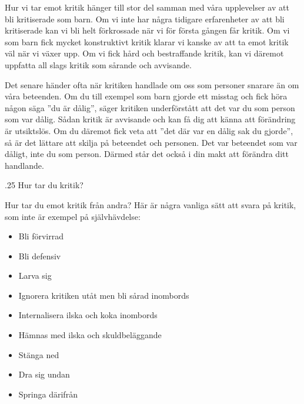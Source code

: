 \documentclass[swedish,a4paper]{book}
\makeatletter
\renewcommand\subsection{\@startsection{subsection}{1}{\z@}%
                                   {\baselineskip}%
                                   {.25\baselineskip}%
                                   {\fontsize{1\baselineskip}{1.25\baselineskip}\selectfont\sffamily\bfseries}} %
\makeatother
\begin{document}
Hur vi tar emot kritik hänger till stor del samman med våra upplevelser av att bli kritiserade som barn. Om vi inte har några tidigare erfarenheter av att bli kritiserade kan vi bli helt förkrossade när vi för första gången får kritik. Om vi som barn fick mycket konstruktivt kritik klarar vi kanske av att ta emot kritik väl när vi växer upp. Om vi fick hård och bestraffande kritik, kan vi däremot uppfatta all slags kritik som sårande och avvisande.

Det senare händer ofta när kritiken handlade om oss som personer snarare än om våra beteenden.
Om du till exempel som barn gjorde ett misstag och fick höra någon säga ''du är dålig'', säger kritiken underförstått att det var du som person som var dålig. Sådan kritik är avvisande och kan få dig att känna att förändring är utsiktslös. Om du däremot fick veta att ''det där var en dålig sak du gjorde'', så är det lättare att skilja på beteendet och personen. Det var beteendet som var dåligt, inte du som person. Därmed står det också i din makt att förändra ditt handlande.

\subsection{Hur tar du kritik?}

Hur tar du emot kritik från andra? Här är några vanliga sätt att svara på kritik, som inte är exempel på självhävdelse:

\begin{itemize}

\item Bli förvirrad

\item Bli defensiv

\item Larva sig

\item Ignorera kritiken utåt men bli sårad inombords

\item Internalisera ilska och koka inombords

\item Hämnas med ilska och skuldbeläggande

\item Stänga ned

\item Dra sig undan

\item Springa därifrån

\end{itemize}
\end{document}

